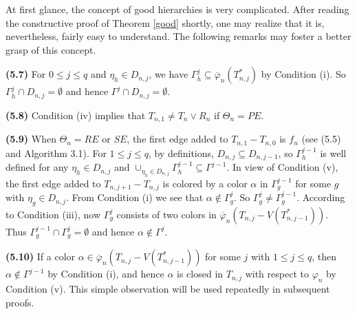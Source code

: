 \documentclass[11pt]{article}
\newcommand{\phibar}{\overline{\varphi}}
\begin{document}
At first glance, the concept of good hierarchies is very complicated. After reading the constructive proof of Theorem \ref{good} shortly,
one may realize that it is, nevertheless, fairly easy to understand. The following remarks may foster a better grasp of 
this concept. 

{\bf (5.7)} For $0 \le j\le q$ and $\eta_h\in D_{n,j}$, we have $\Gamma^{j}_h \subseteq \phibar_n(T_{n,j}^*)$ by Condition (i).
So  $\Gamma^{j}_h \cap D_{n,j}=\emptyset$ and hence $\Gamma^{j} \cap D_{n,j}=\emptyset$.

{\bf (5.8)} Condition (iv) implies that $T_{n,1}\neq T_{n}\vee R_n$ if $\Theta_n=PE$.

{\bf (5.9)} When $\Theta_n=RE$ or $SE$, the first edge added to $T_{n,1}-T_{n,0}$ is $f_n$ (see (5.5) and Algorithm 3.1). 
For $1\le j\le q$, by definitions, $D_{n,j} \subseteq D_{n,j-1}$, so $\Gamma^{j-1}_h$ is well defined for any
$\eta_h\in D_{n,j}$ and $\cup_{\eta_h\in D_{n,j}}\Gamma^{j-1}_h \subseteq \Gamma^{j-1}$. In view of Condition 
(v), the first edge added to $T_{n,j+1}- T_{n,j}$ is colored by a color $\alpha$ in $\Gamma^{j-1}_g$
for some $g$ with $\eta_g\in D_{n,j}$. From Condition (i)  we see that $\alpha\notin \Gamma^{j}_g$. So 
$ \Gamma^{j}_g \ne \Gamma^{j-1}_g$. According to Condition (iii), now $\Gamma^{j}_g$ consists of two colors in 
$\phibar_n(T_{n,j} -V(T_{n,j-1}^*))$. Thus $\Gamma^{j-1}_g \cap \Gamma^{j}_g=\emptyset$ and hence $\alpha \notin 
\Gamma^j$.

{\bf (5.10)} If a color $\alpha \in \phibar_n(T_{n,j}-V(T_{n,j-1}^*))$ for some $j$ with $1 \le j \le q$, then
$\alpha \notin \Gamma^{j-1}$ by Condition (i), and hence $\alpha$ is closed in $T_{n,j}$ with respect to $\varphi_n$ 
by Condition (v). This simple observation will be used repeatedly in subsequent proofs.
\end{document}
